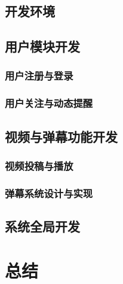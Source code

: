 \subsection{开发环境}
\subsection{用户模块开发}

\subsubsection{用户注册与登录}

\subsubsection{用户关注与动态提醒}

\subsection{视频与弹幕功能开发}

\subsubsection{视频投稿与播放}

\subsubsection{弹幕系统设计与实现}

\subsection{系统全局开发}

\newpage

\section{总结}

\newpage

